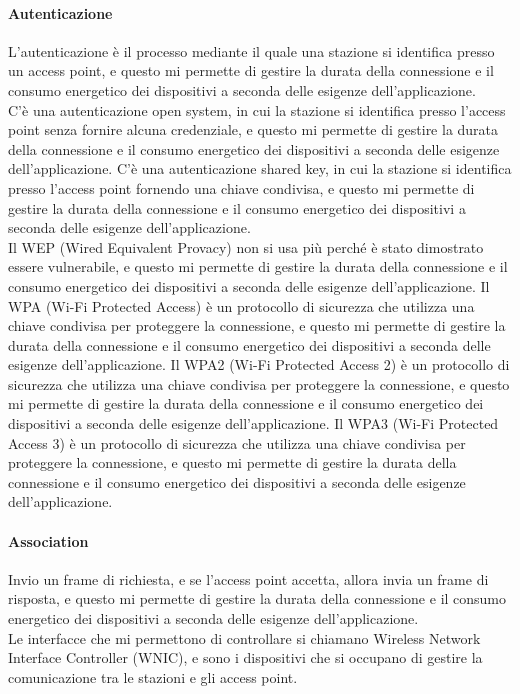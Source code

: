 \paragraph{Autenticazione}
L'autenticazione è il processo mediante il quale una stazione si identifica presso un access point, e questo mi permette di gestire la durata della connessione e il consumo energetico dei dispositivi a seconda delle esigenze dell'applicazione.\\
C'è una autenticazione open system, in cui la stazione si identifica presso l'access point senza fornire alcuna credenziale, e questo mi permette di gestire la durata della connessione e il consumo energetico dei dispositivi a seconda delle esigenze dell'applicazione. C'è una autenticazione shared key, in cui la stazione si identifica presso l'access point fornendo una chiave condivisa, e questo mi permette di gestire la durata della connessione e il consumo energetico dei dispositivi a seconda delle esigenze dell'applicazione.\\
Il WEP (Wired Equivalent Provacy) non si usa più perché è stato dimostrato essere vulnerabile, e questo mi permette di gestire la durata della connessione e il consumo energetico dei dispositivi a seconda delle esigenze dell'applicazione. Il WPA (Wi-Fi Protected Access) è un protocollo di sicurezza che utilizza una chiave condivisa per proteggere la connessione, e questo mi permette di gestire la durata della connessione e il consumo energetico dei dispositivi a seconda delle esigenze dell'applicazione. Il WPA2 (Wi-Fi Protected Access 2) è un protocollo di sicurezza che utilizza una chiave condivisa per proteggere la connessione, e questo mi permette di gestire la durata della connessione e il consumo energetico dei dispositivi a seconda delle esigenze dell'applicazione. Il WPA3 (Wi-Fi Protected Access 3) è un protocollo di sicurezza che utilizza una chiave condivisa per proteggere la connessione, e questo mi permette di gestire la durata della connessione e il consumo energetico dei dispositivi a seconda delle esigenze dell'applicazione.\\

\paragraph{Association}
Invio un frame di richiesta, e se l'access point accetta, allora invia un frame di risposta, e questo mi permette di gestire la durata della connessione e il consumo energetico dei dispositivi a seconda delle esigenze dell'applicazione.\\
Le interfacce che mi permettono di controllare si chiamano  Wireless Network Interface Controller (WNIC), e sono i dispositivi che si occupano di gestire la comunicazione tra le stazioni e gli access point.\\

